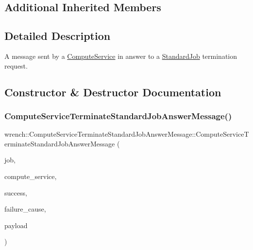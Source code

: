 \subsection*{Additional Inherited Members}


\subsection{Detailed Description}
A message sent by a \hyperlink{classwrench_1_1_compute_service}{Compute\+Service} in answer to a \hyperlink{classwrench_1_1_standard_job}{Standard\+Job} termination request. 

\subsection{Constructor \& Destructor Documentation}
\mbox{\label{classwrench_1_1_compute_service_terminate_standard_job_answer_message_ab408fa45bc95a5c27cb9c79d914d4ec4}} 
\subsubsection{\texorpdfstring{Compute\+Service\+Terminate\+Standard\+Job\+Answer\+Message()}{ComputeServiceTerminateStandardJobAnswerMessage()}}
{\footnotesize\ttfamily wrench\+::\+Compute\+Service\+Terminate\+Standard\+Job\+Answer\+Message\+::\+Compute\+Service\+Terminate\+Standard\+Job\+Answer\+Message (\begin{DoxyParamCaption}\item[{\hyperlink{classwrench_1_1_standard_job}{Standard\+Job} $\ast$}]{job,  }\item[{\hyperlink{classwrench_1_1_compute_service}{Compute\+Service} $\ast$}]{compute\+\_\+service,  }\item[{bool}]{success,  }\item[{std\+::shared\+\_\+ptr$<$ \hyperlink{classwrench_1_1_failure_cause}{Failure\+Cause} $>$}]{failure\+\_\+cause,  }\item[{double}]{payload }\end{DoxyParamCaption})}



